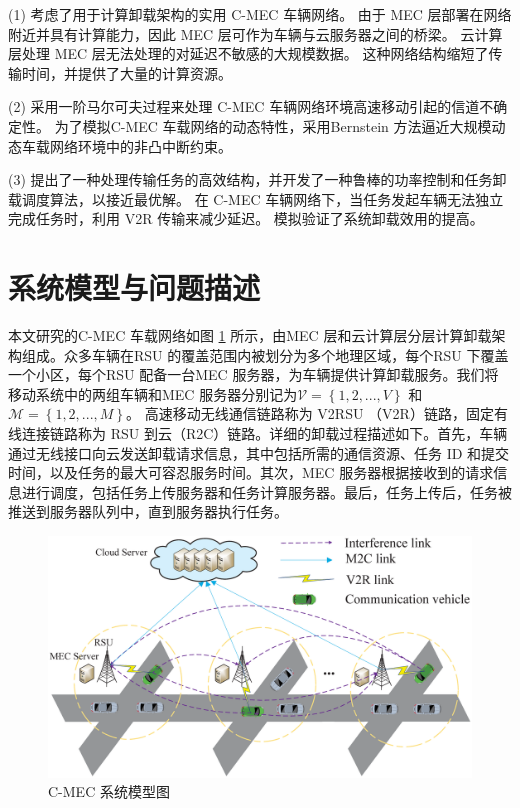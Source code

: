 (1) 考虑了用于计算卸载架构的实用 C-MEC 车辆网络。 由于 MEC 层部署在网络附近并具有计算能力，因此 MEC 层可作为车辆与云服务器之间的桥梁。 云计算层处理 MEC 层无法处理的对延迟不敏感的大规模数据。 这种网络结构缩短了传输时间，并提供了大量的计算资源。

(2) 采用一阶马尔可夫过程来处理 C-MEC 车辆网络环境高速移动引起的信道不确定性。 为了模拟C-MEC 车载网络的动态特性，采用Bernstein 方法逼近大规模动态车载网络环境中的非凸中断约束。

(3) 提出了一种处理传输任务的高效结构，并开发了一种鲁棒的功率控制和任务卸载调度算法，以接近最优解。 在 C-MEC 车辆网络下，当任务发起车辆无法独立完成任务时，利用 V2R 传输来减少延迟。 模拟验证了系统卸载效用的提高。
\section{系统模型与问题描述}\label{section3-2}
本文研究的C-MEC 车载网络如图 \ref{F1} 所示，由MEC 层和云计算层分层计算卸载架构组成。众多车辆在RSU 的覆盖范围内被划分为多个地理区域，每个RSU 下覆盖一个小区，每个RSU 配备一台MEC 服务器，为车辆提供计算卸载服务。我们将移动系统中的两组车辆和MEC 服务器分别记为$\mathcal{V}=\left\{1,2,..., V\right\}$ 和$\mathcal{M}=\left\{1,2,..., M\right\}$。 高速移动无线通信链路称为 V2RSU （V2R）链路，固定有线连接链路称为 RSU 到云（R2C）链路。详细的卸载过程描述如下。首先，车辆通过无线接口向云发送卸载请求信息，其中包括所需的通信资源、任务 ID 和提交时间，以及任务的最大可容忍服务时间。其次，MEC 服务器根据接收到的请求信息进行调度，包括任务上传服务器和任务计算服务器。最后，任务上传后，任务被推送到服务器队列中，直到服务器执行任务。
\begin{figure}[H]
\centering
\includegraphics[width=12cm]{figures//chap3//model2.eps}
\caption{C-MEC 系统模型图}
\label{F1}
\end{figure}

